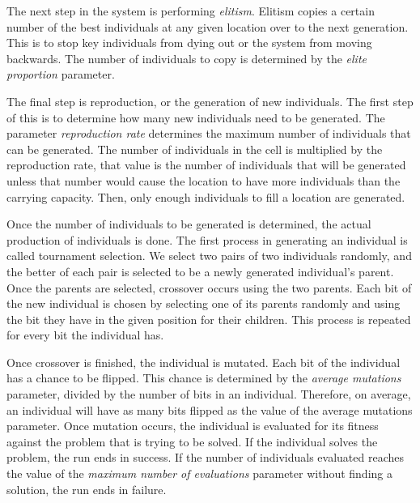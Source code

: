 \documentclass[12pt]{article}
\begin{document}
The next step in the system is performing \emph{elitism}. Elitism copies a certain number of the best individuals at any given location over to the next generation. This is to stop key individuals from dying out or the system from moving backwards. The number of individuals to copy is determined by the \emph{elite proportion} parameter.

The final step is reproduction, or the generation of new individuals. The first step of this is to determine how many new individuals need to be generated. The parameter \emph{reproduction rate} determines the maximum number of individuals that can be generated. The number of individuals in the cell is multiplied by the reproduction rate, that value is the number of individuals that will be generated unless that number would cause the location to have more individuals than the carrying capacity. Then, only enough individuals to fill a location are generated.

Once the number of individuals to be generated is determined, the actual production of individuals is done. The first process in generating an individual is called tournament selection. We select two pairs of two individuals randomly, and the better of each pair is selected to be a newly generated individual's parent. Once the parents are selected, crossover occurs using the two parents. Each bit of the new individual is chosen by selecting one of its parents randomly and using the bit they have in the given position for their children. This process is repeated for every bit the individual has.

Once crossover is finished, the individual is mutated. Each bit of the individual has a chance to be flipped. This chance is determined by the \emph{average mutations} parameter, divided by the number of bits in an individual. Therefore, on average, an individual will have as many bits flipped as the value of the average mutations parameter. Once mutation occurs, the individual is evaluated for its fitness against the problem that is trying to be solved. If the individual solves the problem, the run ends in success. If the number of individuals evaluated reaches the value of the \emph{maximum number of evaluations} parameter without finding a solution, the run ends in failure.
\end{document}
